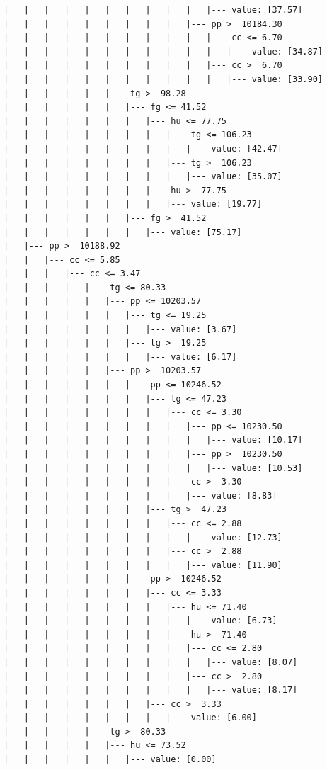 \documentclass[UTF8, a4paper]{ctexart}
\begin{document}
\begin{lstlisting}
|   |   |   |   |   |   |   |   |   |   |--- value: [37.57]
|   |   |   |   |   |   |   |   |   |--- pp >  10184.30
|   |   |   |   |   |   |   |   |   |   |--- cc <= 6.70
|   |   |   |   |   |   |   |   |   |   |   |--- value: [34.87]
|   |   |   |   |   |   |   |   |   |   |--- cc >  6.70
|   |   |   |   |   |   |   |   |   |   |   |--- value: [33.90]
|   |   |   |   |   |--- tg >  98.28
|   |   |   |   |   |   |--- fg <= 41.52
|   |   |   |   |   |   |   |--- hu <= 77.75
|   |   |   |   |   |   |   |   |--- tg <= 106.23
|   |   |   |   |   |   |   |   |   |--- value: [42.47]
|   |   |   |   |   |   |   |   |--- tg >  106.23
|   |   |   |   |   |   |   |   |   |--- value: [35.07]
|   |   |   |   |   |   |   |--- hu >  77.75
|   |   |   |   |   |   |   |   |--- value: [19.77]
|   |   |   |   |   |   |--- fg >  41.52
|   |   |   |   |   |   |   |--- value: [75.17]
|   |--- pp >  10188.92
|   |   |--- cc <= 5.85
|   |   |   |--- cc <= 3.47
|   |   |   |   |--- tg <= 80.33
|   |   |   |   |   |--- pp <= 10203.57
|   |   |   |   |   |   |--- tg <= 19.25
|   |   |   |   |   |   |   |--- value: [3.67]
|   |   |   |   |   |   |--- tg >  19.25
|   |   |   |   |   |   |   |--- value: [6.17]
|   |   |   |   |   |--- pp >  10203.57
|   |   |   |   |   |   |--- pp <= 10246.52
|   |   |   |   |   |   |   |--- tg <= 47.23
|   |   |   |   |   |   |   |   |--- cc <= 3.30
|   |   |   |   |   |   |   |   |   |--- pp <= 10230.50
|   |   |   |   |   |   |   |   |   |   |--- value: [10.17]
|   |   |   |   |   |   |   |   |   |--- pp >  10230.50
|   |   |   |   |   |   |   |   |   |   |--- value: [10.53]
|   |   |   |   |   |   |   |   |--- cc >  3.30
|   |   |   |   |   |   |   |   |   |--- value: [8.83]
|   |   |   |   |   |   |   |--- tg >  47.23
|   |   |   |   |   |   |   |   |--- cc <= 2.88
|   |   |   |   |   |   |   |   |   |--- value: [12.73]
|   |   |   |   |   |   |   |   |--- cc >  2.88
|   |   |   |   |   |   |   |   |   |--- value: [11.90]
|   |   |   |   |   |   |--- pp >  10246.52
|   |   |   |   |   |   |   |--- cc <= 3.33
|   |   |   |   |   |   |   |   |--- hu <= 71.40
|   |   |   |   |   |   |   |   |   |--- value: [6.73]
|   |   |   |   |   |   |   |   |--- hu >  71.40
|   |   |   |   |   |   |   |   |   |--- cc <= 2.80
|   |   |   |   |   |   |   |   |   |   |--- value: [8.07]
|   |   |   |   |   |   |   |   |   |--- cc >  2.80
|   |   |   |   |   |   |   |   |   |   |--- value: [8.17]
|   |   |   |   |   |   |   |--- cc >  3.33
|   |   |   |   |   |   |   |   |--- value: [6.00]
|   |   |   |   |--- tg >  80.33
|   |   |   |   |   |--- hu <= 73.52
|   |   |   |   |   |   |--- value: [0.00]

\end{lstlisting}
\end{document}
